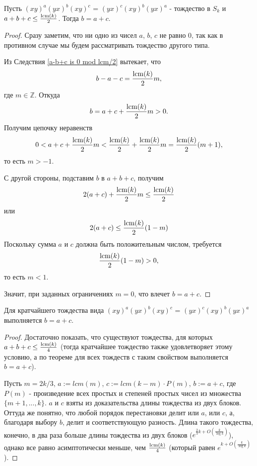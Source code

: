 	\begin{theorem}\label{b is a plus c}
		Пусть $(xy)^a(yx)^b(xy)^c$ = $(yx)^c(xy)^b(yx)^a$ - тождество в $S_k$ и $a + b + c \le \frac{\operatorname{lcm}(k)}{2}$. Тогда $b = a+c$.
	\end{theorem}
	\begin{proof}
		Сразу заметим, что ни одно из чисел $a$, $b$, $c$ не равно 0, так как в противном случае мы будем рассматривать тождество другого типа.
		
		Из Следствия \ref{a-b+c is 0 mod lcm/2} вытекает, что \hspace{5pt} 
		$$
		b - a - c = \frac{\operatorname{lcm}(k)}{2}m,
		$$ где $m \in \mathbb{Z}$. 
		Откуда
		$$
		b = a + c + \frac{\operatorname{lcm}(k)}{2}m > 0.
		$$
		Получим цепочку неравенств 
		$$
		0 < a + c + \frac{\operatorname{lcm}(k)}{2}m < \frac{\operatorname{lcm}(k)}{2} + \frac{\operatorname{lcm}(k)}{2}m = \frac{\operatorname{lcm}(k)}{2}(m + 1),
		$$то есть $m > -1$.
		
		С другой стороны, подставим $b$ в $a+b+c$, получим
		$$
		2(a + c) + \frac{\operatorname{lcm}(k)}{2}m \le \frac{\operatorname{lcm}(k)}{2}
		$$ или 
		$$
		2(a + c) \le \frac{\operatorname{lcm}(k)}{2}(1-m)
		$$
		Поскольку сумма $a$ и $c$ должна быть положительным числом, требуется
		$$
		\frac{\operatorname{lcm}(k)}{2}(1-m) > 0,
		$$ то есть $m < 1$.
		
		Значит, при заданных ограничениях $m = 0$, что влечет $b = a + c$.
	\end{proof}
	
	\begin{corollary}
		Для кратчайшего тождества вида $(xy)^a(yx)^b(xy)^c$ = $(yx)^c(xy)^b(yx)^a$ выполняется $b = a + c$.
	\end{corollary}
	\begin{proof}
		Достаточно показать, что существуют тождества, для которых $a + b + c \le \frac{\operatorname{lcm}(k)}{4}$ (тогда кратчайшее тождество также удовлетворяет этому условию, а по теореме для всех тождеств с таким свойством выполняется $b = a + c$).
		
		Пусть $m = 2k/3$, $a := lcm(m)$, $c := lcm(k - m) \cdot P(m)$, $b := a+c$, где $P(m)$ - произведение всех простых и степеней простых чисел из множества $\{m+1, ..., k\}$. $a$ и $c$ взяты из доказательства длины тождества из двух блоков. Оттуда же понятно, что любой порядок перестановки делит или $a$, или $c$, а, благодаря выбору $b$, делит и соответствующую разность. Длина такого тождества, конечно, в два раза больше длины тождества из двух блоков ($e^{\frac{2}{3}k + O(\frac{k}{\log k})}$), однако все равно асимптотически меньше, чем $\frac{\operatorname{lcm}(k)}{4}$ (который  равен $e^{k + O(\frac{k}{\log k})}$).
	\end{proof}
	
